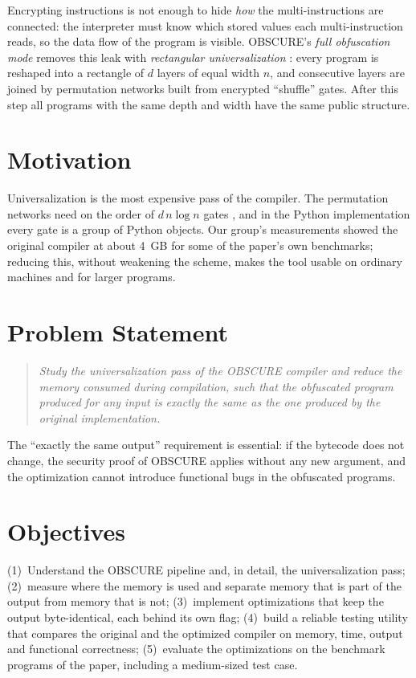 \documentclass[12pt,a4paper,oneside]{report}
\begin{document}
Encrypting instructions is not enough to hide \emph{how} the multi-instructions are connected:
the interpreter must know which stored values each multi-instruction reads, so the data flow of
the program is visible. OBSCURE's \emph{full obfuscation mode} removes this leak with
\emph{rectangular universalization} \cite[Sec.~3]{obscure}: every program is reshaped into a
rectangle of $d$ layers of equal width $n$, and consecutive layers are joined by permutation
networks built from encrypted ``shuffle'' gates. After this step all programs with the same
depth and width have the same public structure.

\section{Motivation}
Universalization is the most expensive pass of the compiler. The permutation networks need on the
order of $d\,n\log n$ gates \cite{obscure}, and in the Python implementation every gate is a
group of Python objects. Our group's measurements showed the original compiler at about 4~GB for some of the
paper's own benchmarks; reducing this, without weakening the scheme, makes the tool usable on
ordinary machines and for larger programs.

\section{Problem Statement}
\begin{quote}
\emph{Study the universalization pass of the OBSCURE compiler and reduce the memory consumed
during compilation, such that the obfuscated program produced for any input is exactly the same
as the one produced by the original implementation.}
\end{quote}
The ``exactly the same output'' requirement is essential: if the bytecode does not change, the
security proof of OBSCURE \cite[Thm.~1]{obscure} applies without any new argument, and the
optimization cannot introduce functional bugs in the obfuscated programs.

\section{Objectives}
(1)~Understand the OBSCURE pipeline and, in detail, the universalization pass;
(2)~measure where the memory is used and separate memory that is part of the output from memory
that is not; (3)~implement optimizations that keep the output byte-identical, each behind its own
flag; (4)~build a reliable testing utility that compares the original and the optimized compiler
on memory, time, output and functional correctness; (5)~evaluate the optimizations on the
benchmark programs of the paper, including a medium-sized test case.
\end{document}
